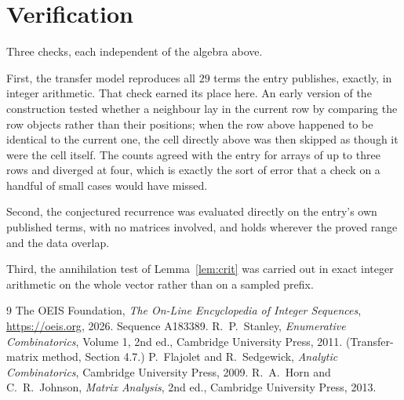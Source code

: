 \documentclass[11pt,a4paper]{article}
\theoremstyle{plain}
\theoremstyle{definition}
\begin{document}
\section{Verification}

Three checks, each independent of the algebra above.

First, the transfer model reproduces all $29$ terms the entry publishes, exactly, in
integer arithmetic. That check earned its place here. An early version of the construction
tested whether a neighbour lay in the current row by comparing the row objects rather
than their positions; when the row above happened to be identical to the current one, the
cell directly above was then skipped as though it were the cell itself. The counts agreed with
the entry for arrays of up to three rows and diverged at four, which is exactly the sort of
error that a check on a handful of small cases would have missed.

Second, the conjectured recurrence was evaluated directly on the entry's own published terms,
with no matrices involved, and holds wherever the proved range and the data overlap.

Third, the annihilation test of Lemma~\ref{lem:crit} was carried out in exact integer
arithmetic on the whole vector rather than on a sampled prefix.

\begin{thebibliography}{9}
 The OEIS Foundation, \emph{The On-Line Encyclopedia of Integer
Sequences}, \url{https://oeis.org}, 2026. Sequence A183389.
 R.~P.~Stanley, \emph{Enumerative Combinatorics}, Volume 1, 2nd ed.,
Cambridge University Press, 2011. (Transfer-matrix method, Section 4.7.)
 P.~Flajolet and R.~Sedgewick, \emph{Analytic Combinatorics}, Cambridge
University Press, 2009.
 R.~A.~Horn and C.~R.~Johnson, \emph{Matrix Analysis}, 2nd ed., Cambridge
University Press, 2013.
\end{thebibliography}
\end{document}
